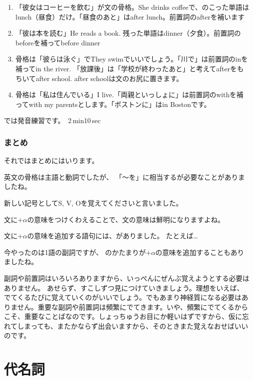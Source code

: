 \documentclass[book,jafontscale=0.9247]{jlreq}
\begin{document}
\begin{enumerate}
 \item 「彼女はコーヒーを飲む」が文の骨格。She drinks coffeeで、のこった単語はlunch（昼食）だけ。「昼食のあと」はafter lunch。前置詞のafterを補います
 \item 「彼は本を読む」He reads a book. 残った単語はdinner（夕食）。前置詞のbeforeを補ってbefore dinner
 \item 骨格は「彼らは泳ぐ」でThey swimでいいでしょう。「川で」は前置詞のinを補ってin the river. 「放課後」は「学校が終わったあと」と考えてafterをもちいてafter school. after schoolは文のお尻に置きます。
 \item 骨格は「私は住んでいる」I live.「両親といっしょに」は前置詞のwithを補ってwith my parentsとします。「ボストンに」はin Bostonです。
\end{enumerate}

では発音練習です。
\faVolumeUp\,2\,min10\,sec

\subsection{まとめ}

それではまとめにはいります。

英文の骨格は主語と動詞でしたが、
「～を」に相当するが必要なことがありましたね。

新しい記号としてS, V, Oを覚えてくださいと言いました。

文に$+\alpha$の意味をつけくわえることで、文の意味は鮮明になりますよね。

文に$+\alpha$の意味を追加する語句には、がありました。
たとえば\ldots

今やったのは1語の副詞ですが、
のかたまりが$+\alpha$の意味を追加することもありましたね。

副詞や前置詞はいろいろありますから、いっぺんにぜんぶ覚えようとする必要はありません。
あせらず、すこしずつ見につけていきましょう。理想をいえば、でてくるたびに覚えていくのがいいでしょう。でもあまり神経質になる必要はありません。重要な副詞や前置詞は頻繁にでてきます。いや、頻繁にでてくるからこそ、重要なことばなのです。しょっちゅうお目にか軽いはずですから、仮に忘れてしまっても、またかならず出会いますから、そのときまた覚えなおせばいいのです。
\chapter{代名詞}
\end{document}

